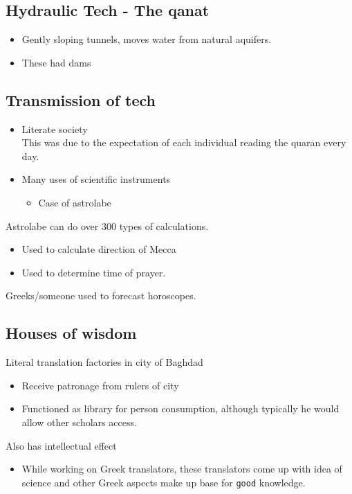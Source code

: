 \documentclass[11pt]{article}
\begin{document}
\subsection{Hydraulic Tech - The qanat}
\label{sec-8-8}
\begin{itemize}
\item Gently sloping tunnels, moves water from natural aquifers.
\item These had dams
\end{itemize}

\subsection{Transmission of tech}
\label{sec-8-9}
\begin{itemize}
\item Literate society\\
  This was due to the expectation of each individual reading the quaran every day.

\item Many uses of scientific instruments
\begin{itemize}
\item Case of astrolabe
\end{itemize}
\end{itemize}

Astrolabe can do over 300 types of calculations.
\begin{itemize}
\item Used to calculate direction of Mecca
\item Used to determine time of prayer.
\end{itemize}

Greeks/someone used to forecast horoscopes.

\subsection{Houses of wisdom}
\label{sec-8-10}
Literal translation factories in city of Baghdad
\begin{itemize}
\item Receive patronage from rulers of city\\
\item Functioned as library for person consumption, although typically he would allow other scholars access.
\end{itemize}

Also has intellectual effect
\begin{itemize}
\item While working on Greek translators, these translators come up with idea of science and other Greek aspects make up base for \texttt{good} knowledge.
\end{itemize}
\end{document}
